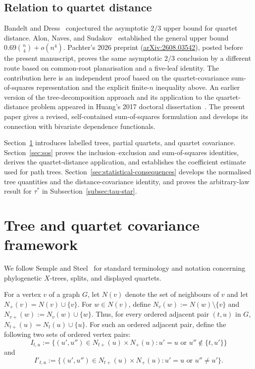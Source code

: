 \documentclass[pdflatex,sn-mathphys-num]{sn-jnl}
\theoremstyle{thmstyleone}
\begin{document}
\subsection{Relation to quartet distance}
Bandelt and Dress~\cite{BandeltDress1986} conjectured the asymptotic $2/3$
upper bound for quartet distance.  Alon, Naves, and
Sudakov~\cite{AlonNavesSudakov2016} established the general upper bound
$0.69\binom n4+o(n^4)$.  Pachter's 2026 preprint
(\href{https://arxiv.org/abs/2608.03542}{arXiv:2608.03542}), posted before the
present manuscript, proves the same asymptotic $2/3$ conclusion by a different
route based on common-root planarisation and a five-leaf identity.  The
contribution here is an independent proof based on the quartet-covariance
sum-of-squares representation and the explicit finite-$n$ inequality above.
An earlier version of the tree-decomposition approach and its application to
the quartet-distance problem appeared in Huang's 2017 doctoral
dissertation~\cite{Huang2017}.  The present paper gives a revised,
self-contained sum-of-squares formulation and develops its connection with
bivariate dependence functionals.

Section~\ref{sec:tree-framework} introduces labelled trees, partial quartets,
and quartet covariance.  Section~\ref{sec:sos} proves the
inclusion--exclusion and sum-of-squares identities, derives the
quartet-distance application, and establishes the coefficient estimate used
for path trees.  Section~\ref{sec:statistical-consequences} develops the
normalised tree quantities and the distance-covariance identity, and proves
the arbitrary-law result for $\tau^*$ in
Subsection~\ref{subsec:tau-star}.

\section{Tree and quartet covariance framework}
\label{sec:tree-framework}

We follow Semple and Steel~\cite{SempleSteel2003} for standard terminology and
notation concerning phylogenetic $X$-trees, splits, and displayed quartets.

For a vertex $v$ of a graph $G$, let $N(v)$ denote the set of neighbours
of $v$ and let $N_+(v)=N(v)\cup\{v\}$.  For $w\in N(v)$, define
$N_v(w):=N(w)\setminus\{v\}$ and $N_{v+}(w):=N_v(w)\cup\{w\}$.
Thus, for every ordered adjacent pair $(t,u)$ in $G$,
$N_{t+}(u)=N_t(u)\cup\{u\}$.  For such an ordered adjacent pair, define the
following two sets of ordered vertex pairs:
\[
 I_{t,u}:=\{(u',u'')\in N_{t+}(u)\times N_+(u):
 u'=u\text{ or }u''\notin\{t,u'\}\}
\]
and
\[
 I'_{t,u}:=\{(u',u'')\in N_{t+}(u)\times N_+(u):
 u'=u\text{ or }u''\ne u'\}.
\]
\end{document}
